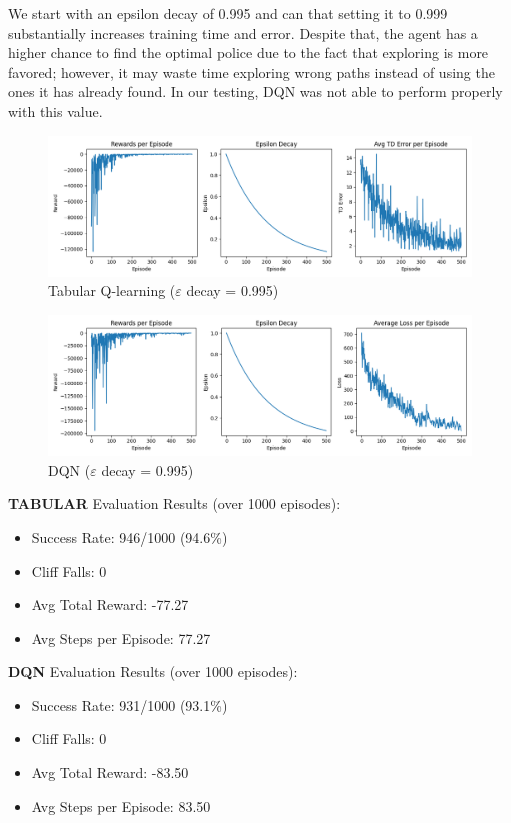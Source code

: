 \documentclass[a4paper,12pt]{article}
\begin{document}
\noindent We start with an epsilon decay of 0.995 and can that setting it to 0.999 substantially increases training time and error. Despite that, the agent has a higher chance to find the optimal police due to the fact that exploring is more favored; however, it may waste time exploring wrong paths instead of using the ones it has already found. In our testing, DQN was not able to perform properly with this value.

\begin{figure}[H]
    \centering
    \includegraphics[width=\linewidth]{2_32_0995_64_slip_tab.png}
    \caption{Tabular Q-learning ($\varepsilon$ decay = 0.995)}
\end{figure}
\begin{figure}[H]
    \centering
    \includegraphics[width=\linewidth]{2_32_0995_64_slip_dqn.png}
    \caption{DQN ($\varepsilon$ decay = 0.995)}
\end{figure}
\noindent \textbf{TABULAR} Evaluation Results (over 1000 episodes):
\begin{itemize}
    \item Success Rate: 946/1000 (94.6\%)
    \item Cliff Falls: 0
    \item Avg Total Reward: -77.27
    \item Avg Steps per Episode: 77.27
\end{itemize}
\textbf{DQN} Evaluation Results (over 1000 episodes):
\begin{itemize}
    \item Success Rate: 931/1000 (93.1\%)
    \item Cliff Falls: 0
    \item Avg Total Reward: -83.50
    \item Avg Steps per Episode: 83.50
\end{itemize}
\end{document}
